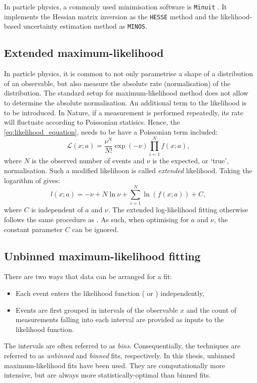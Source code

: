 In particle physics, a commonly used minimisation software is \texttt{Minuit} \cite{James:1975dr,James:2296388}.
It implements the Hessian matrix inversion as the \texttt{HESSE} method and the likelihood-based uncertainty estimation method as \texttt{MINOS}.
\subsection{Extended maximum-likelihood}

In particle physics, it is common to not only parametrise a shape of a distribution of an observable, but also measure the absolute rate (normalisation) of the distribution.
The standard setup for maximum-likelihood method does not allow to determine the absolute normalisation. 
An additional term to the likelihood is to be introduced.
In Nature, if a measurement is performed repeatedly, its rate will fluctuate according to Poissonian statisics.
Hence, the \cref{eq:likelihood_equation}, needs to be have a Poissonian term included:
\begin{equation}\label{eq:extended_likelihood}
    \mathcal{L}(x;a) = \frac{\nu^N}{N!}\exp(-\nu)\prod_{i=1}^N f(x;a),
\end{equation}
where $N$ is the observed number of events and $\nu$ is the expected, or `true', normalisation. 
Such a modified likelihoon is called \textit{extended} likelihood.
Taking the logarithm of  gives:
\begin{equation}\label{eq:extended_log_likelihood}
    l(x;a) = -\nu + N\ln{\nu} + \sum_{i=1}^N \ln (f(x;a)) + C,
\end{equation}
where $C$ is independent of $a$ and $\nu$. 
The extended log-likelihood fitting otherwise follows the same procedure as .
As such, when optimising  for $a$ and $\nu$, the constant parameter $C$ can be ignored.

\subsection{Unbinned maximum-likelihood fitting}

There are two ways that data can be arranged for a fit: 

\begin{itemize}
    \item Each event enters the likelihood function ( or ) independently,
    \item Events are first grouped in intervals of the observable $x$ and the count of measurements falling into each interval are provided as inputs to the likelihood function.
\end{itemize}
The intervals are often referred to as \textit{bins}. 
Consequentially, the techniques are referred to as \textit{unbinned} and \textit{binned} fits, respectively.
In this thesis, unbinned maximum-likelihood fits have been used. 
They are computationally more intensive, but are always more statistically-optimal than binned fits. 

